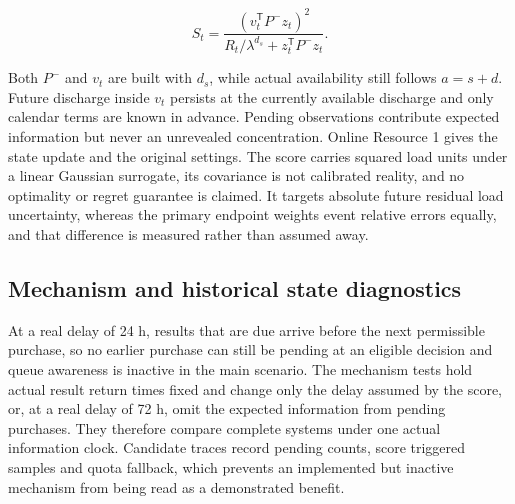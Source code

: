 \documentclass[pdflatex,sn-mathphys-num]{sn-jnl}%
\theoremstyle{thmstyleone}%
\theoremstyle{thmstyletwo}%
\theoremstyle{thmstylethree}%
\begin{document}
\begin{equation}
S_t=\frac{(v_t^{\mathsf T}P^-z_t)^2}{R_t/\lambda^{d_s}+z_t^{\mathsf T}P^-z_t}.
\end{equation}

Both $P^-$ and $v_t$ are built with $d_s$, while actual availability still follows $a=s+d$. Future discharge inside $v_t$ persists at the currently available discharge and only calendar terms are known in advance. Pending observations contribute expected information but never an unrevealed concentration. Online Resource 1 gives the state update and the original settings. The score carries squared load units under a linear Gaussian surrogate, its covariance is not calibrated reality, and no optimality or regret guarantee is claimed. It targets absolute future residual load uncertainty, whereas the primary endpoint weights event relative errors equally, and that difference is measured rather than assumed away.

\subsection{Mechanism and historical state diagnostics}

At a real delay of 24 h, results that are due arrive before the next permissible purchase, so no earlier purchase can still be pending at an eligible decision and queue awareness is inactive in the main scenario. The mechanism tests hold actual result return times fixed and change only the delay assumed by the score, or, at a real delay of 72 h, omit the expected information from pending purchases. They therefore compare complete systems under one actual information clock. Candidate traces record pending counts, score triggered samples and quota fallback, which prevents an implemented but inactive mechanism from being read as a demonstrated benefit.
\end{document}
